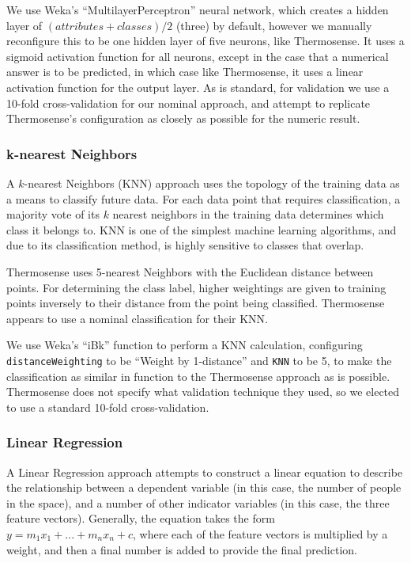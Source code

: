 \documentclass[../thesis/thesis.tex]{subfiles}
\begin{document}
We use Weka's ``MultilayerPerceptron'' neural network, which creates a hidden layer of $(\mathit{attributes} + \mathit{classes}) / 2$ (three) by default, however we manually reconfigure this to be one hidden layer of five neurons, like Thermosense. It uses a sigmoid activation function for all neurons, except in the case that a numerical answer is to be predicted, in which case like Thermosense, it uses a linear activation function for the output layer. As is standard, for validation we use a 10-fold cross-validation for our nominal approach, and attempt to replicate Thermosense's configuration as closely as possible for the numeric result. %

\subsubsection{k-nearest Neighbors}
A $k$-nearest Neighbors (KNN) approach uses the topology of the training data as a means to classify future data. For each data point that requires classification, a majority vote of its $k$ nearest neighbors in the training data determines which class it belongs to. KNN is one of the simplest machine learning algorithms, and due to its classification method, is highly sensitive to classes that overlap. 

Thermosense uses 5-nearest Neighbors with the Euclidean distance between points. For determining the class label, higher weightings are given to training points inversely to their distance from the point being classified. Thermosense appears to use a nominal classification for their KNN.

We use Weka's ``iBk'' function to perform a KNN calculation, configuring \texttt{distanceWeighting} to be ``Weight by 1-distance'' and \texttt{KNN} to be 5, to make the classification as similar in function to the Thermosense approach as is possible. Thermosense does not specify what validation technique they used, so we elected to use a standard 10-fold cross-validation.

\subsubsection{Linear Regression}
A Linear Regression approach attempts to construct a linear equation to describe the relationship between a dependent variable (in this case, the number of people in the space), and a number of other indicator variables (in this case, the three feature vectors). Generally, the equation takes the form $y = m_1x_1 + ... + m_nx_n + c$, where each of the feature vectors is multiplied by a weight, and then a final number is added to provide the final prediction.
\end{document}
